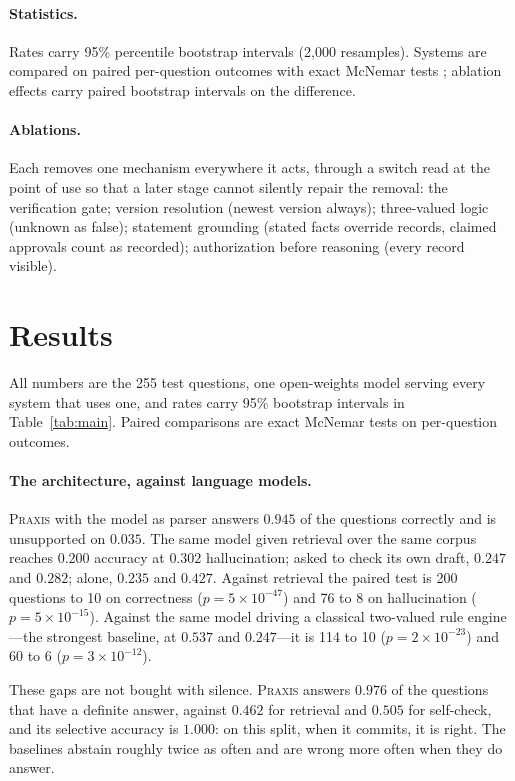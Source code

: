 \documentclass[11pt]{article}
\begin{document}
\paragraph{Statistics.} Rates carry 95\% percentile bootstrap intervals (2{,}000 resamples).
Systems are compared on paired per-question outcomes with exact McNemar tests
\citep{mcnemar1947}; ablation effects carry paired bootstrap intervals on the difference.

\paragraph{Ablations.} Each removes one mechanism everywhere it acts, through a switch read
at the point of use so that a later stage cannot silently repair the removal: the
verification gate; version resolution (newest version always); three-valued logic (unknown
as false); statement grounding (stated facts override records, claimed approvals count as
recorded); authorization before reasoning (every record visible).

\section{Results}\label{sec:results}
All numbers are the 255 test questions, one open-weights model serving every system that
uses one, and rates carry 95\% bootstrap intervals in Table~\ref{tab:main}. Paired
comparisons are exact McNemar tests on per-question outcomes.

\paragraph{The architecture, against language models.} \textsc{Praxis} with the model as
parser answers $0.945$ of the questions correctly and is unsupported on $0.035$. The same
model given retrieval over the same corpus reaches $0.200$ accuracy at $0.302$
hallucination; asked to check its own draft, $0.247$ and $0.282$; alone, $0.235$ and
$0.427$. Against retrieval the paired test is 200 questions to 10 on correctness
($p=5\times10^{-47}$) and 76 to 8 on hallucination ($p=5\times10^{-15}$). Against the same
model driving a classical two-valued rule engine---the strongest baseline, at $0.537$ and
$0.247$---it is 114 to 10 ($p=2\times10^{-23}$) and 60 to 6 ($p=3\times10^{-12}$).

These gaps are not bought with silence. \textsc{Praxis} answers $0.976$ of the questions
that have a definite answer, against $0.462$ for retrieval and $0.505$ for self-check, and
its selective accuracy is $1.000$: on this split, when it commits, it is right. The
baselines abstain roughly twice as often and are wrong more often when they do answer.
\end{document}
